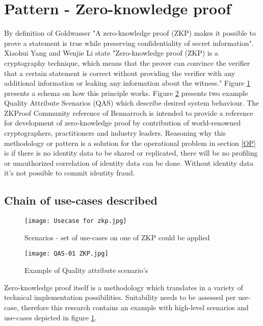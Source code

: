 \section{Pattern - Zero-knowledge proof}
By definition of Goldwasser \etal \cite{Goldwasser} "A zero-knowledge proof (ZKP) makes it possible to prove a statement is true while preserving confidentiality of secret information". 
Xiaohui Yang and Wenjie Li \cite{YANG2020102050} state "Zero-knowledge proof (ZKP) is a cryptography technique, which means that the prover can convince the verifier that a certain statement is correct without providing the verifier with any additional information or leaking any information about the witness." Figure \ref{fig:ZKP_usecase} presents a schema on how this principle works. Figure \ref{fig:QAS01} presents two example Quality Attribute Scenarios (QAS) which describe desired system behaviour. The ZKProof Community reference \cite{2019:zkproof:community-reference-0.2} of Bennarroch \etal is intended to provide a reference for development of zero-knowledge proof by contribution of world-renowned cryptographers, practitioners and industry leaders.
Reasoning why this methodology or pattern is a solution for the operational problem in section \ref{OP} is if there is no identity data to be shared or replicated, there will be no profiling or unauthorized correlation of identity data can be done. Without identity data it's not possible to commit identity fraud.

\subsection{Chain of use-cases described}
\graphicspath{ {./images/} }
\begin{figure}
\centering
\label{fig:ZKP_usecase}
\texttt{[image: Usecase for zkp.jpg]}\\
\caption{Scenarios - set of use-cases on one of ZKP could be applied}
\end{figure}

\graphicspath{ {./images/} }
\begin{figure}
\centering
\label{fig:QAS01}
\texttt{[image: QAS-01 ZKP.jpg]}\\
\caption{Example of Quality attribute scenario's}
\end{figure}


Zero-knowledge proof itself is a methodology which translates in a variety of technical implementation possibilities. Suitability needs to be assessed per use-case, therefore this research contains an example with high-level scenarios and use-cases depicted in figure \ref{fig:ZKP_usecase}.

